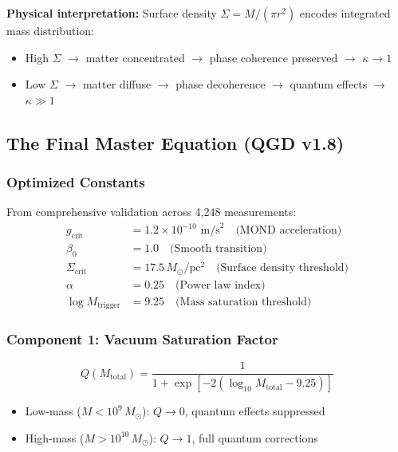 \documentclass[11pt,a4paper]{article}
\theoremstyle{definition}
\theoremstyle{remark}
\begin{document}
	\textbf{Physical interpretation:} Surface density $\Sigma = M/(\pi r^2)$ encodes integrated mass distribution:
	\begin{itemize}
		\item High $\Sigma$ $\to$ matter concentrated $\to$ phase coherence preserved $\to$ $\kappa \to 1$
		\item Low $\Sigma$ $\to$ matter diffuse $\to$ phase decoherence $\to$ quantum effects $\to$ $\kappa \gg 1$
	\end{itemize}
	
	\subsection{The Final Master Equation (QGD v1.8)}
	
	\subsubsection{Optimized Constants}
	
	From comprehensive validation across 4,248 measurements:
	\begin{align}
		g_{\text{crit}} &= 1.2 \times 10^{-10}\text{ m/s}^2 \quad \text{(MOND acceleration)} \label{eq:g_crit} \\
		\beta_0 &= 1.0 \quad \text{(Smooth transition)} \label{eq:beta0} \\
		\Sigma_{\text{crit}} &= 17.5\, M_\odot/\text{pc}^2 \quad \text{(Surface density threshold)} \label{eq:sigma_crit} \\
		\alpha &= 0.25 \quad \text{(Power law index)} \label{eq:alpha_power} \\
		\log M_{\text{trigger}} &= 9.25 \quad \text{(Mass saturation threshold)} \label{eq:M_trigger}
	\end{align}
	
	\subsubsection{Component 1: Vacuum Saturation Factor}
	
	\begin{equation}
		Q(M_{\text{total}}) = \frac{1}{1 + \exp[-2(\log_{10} M_{\text{total}} - 9.25)]}
		\label{eq:Q_factor}
	\end{equation}
	
	\begin{itemize}
		\item Low-mass ($M < 10^9\, M_\odot$): $Q \to 0$, quantum effects suppressed
		\item High-mass ($M > 10^{10}\, M_\odot$): $Q \to 1$, full quantum corrections
	\end{itemize}
	
\end{document}

